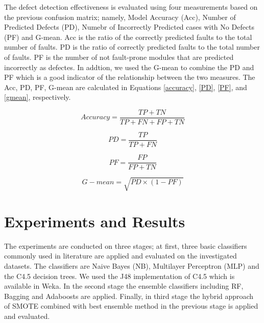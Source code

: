 \documentclass[runningheads,a4paper]{llncs}
\begin{document}
The defect detection effectiveness is evaluated using four measurements based on the previous confusion matrix; namely, Model Accuracy (Acc), Number of Predicted Defects (PD), Numebr of Incorrectly Predicted cases with No Defects (PF) and G-mean. Acc is the ratio of the correctly predicted faults to the total number of faults. PD is
the ratio of correctly predicted faults to the total number of faults. PF is the number of not fault-prone modules that are predicted incorrectly as defectes. In addtion, we used the G-mean to combine the PD and PF which is a good indicator of the relationship between the two measures. The Acc, PD, PF, G-mean are calculated in Equations \ref{accuracy}, \ref{PD}, \ref{PF}, and \ref{gmean}, respectively.

\begin{small}
\begin{equation}
Accuracy=\frac{TP+TN}{TP + FN + FP + TN}
\label{accuracy}
\end{equation}


\begin{equation}
PD=\frac{TP}{TP+FN}
\label{PD}
\end{equation}

\begin{equation}
PF=\frac{FP}{FP+TN}
\label{PF}
\end{equation}

\begin{equation}
G-mean=\sqrt{PD \times (1-PF)}
\label{gmean}
\end{equation}
\end{small}



\section{Experiments and Results}
\label{experiments}

The experiments are conducted on three stages; at first, three basic classifiers commonly used in literature are applied and evaluated on the investigated datasets. The classifiers are Naive Bayes (NB), Multilayer Perceptron (MLP) and the C4.5 decision trees. We used the J48 implementation of C4.5 which is available in Weka. In the second stage the ensemble classifiers including RF, Bagging and Adaboosts are applied. Finally, in third stage the hybrid approach of SMOTE combined with best ensemble method in the previous stage is applied and evaluated.
\end{document}
